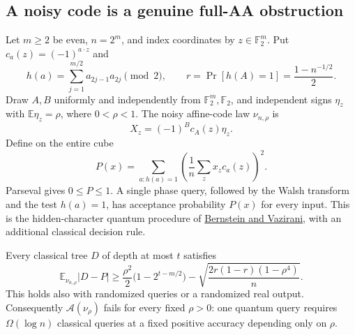 \subsection{A noisy code is a genuine full-AA obstruction}
\label{threshold:noisy-code}

Let $m\ge2$ be even, $n=2^m$, and index coordinates by
$z\in\mathbb F_2^m$.  Put $c_a(z)=(-1)^{a\cdot z}$ and
\[
 h(a)=\sum_{j=1}^{m/2}a_{2j-1}a_{2j}\pmod 2,
 \qquad r=\Pr[h(A)=1]=\frac{1-n^{-1/2}}2.
\]
Draw $A,B$ uniformly and independently from $\mathbb F_2^m,\mathbb F_2$,
and independent signs $\eta_z$ with $\mathbb E\eta_z=\rho$, where
$0<\rho<1$.  The noisy affine-code law $\nu_{n,\rho}$ is
\[
 X_z=(-1)^B c_A(z)\eta_z.
\]
Define on the entire cube
\[
 P(x)=\sum_{a:h(a)=1}\left(\frac1n\sum_z x_zc_a(z)\right)^2.
\]
Parseval gives $0\le P\le1$.  A single phase query, followed by the
Walsh transform and the test $h(a)=1$, has acceptance probability $P(x)$
for every input.  This is the hidden-character quantum procedure of
\href{https://people.eecs.berkeley.edu/~vazirani/pubs/bv.pdf}
{Bernstein and Vazirani}, with an additional classical decision rule.

\begin{theorem}
\label{threshold:noisy-query-theorem}
Every classical tree $D$ of depth at most $t$ satisfies
\[
 \boxed{\displaystyle
 \mathbb E_{\nu_{n,\rho}}|D-P|
 \ge \frac{\rho^2}{2}\bigl(1-2^{t-m/2}\bigr)
 -\sqrt{\frac{2r(1-r)(1-\rho^4)}{n}}.}
 \tag{NQ}
\]
This holds also with randomized queries or a randomized real output.
Consequently $\mathcal A(\nu_{\rho})$ fails for every fixed $\rho>0$:
one quantum query requires $\Omega(\log n)$ classical queries at a
fixed positive accuracy depending only on $\rho$.
\end{theorem}

